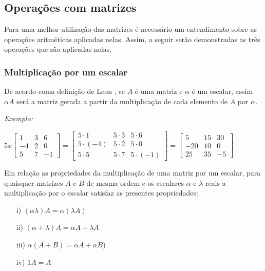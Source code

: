 \subsection{Operações com matrizes}
\noindent Para uma melhor utilização das matrizes é necessário um entendimento sobre as operações aritméticas aplicadas nelas. Assim, a seguir serão demonstradas as três operações que são aplicadas nelas.

\subsubsection{Multiplicação por um escalar}
\noindent De acordo coma definição de Leon \cite{1998:Leon}, se $A$ é uma matriz e $\alpha$ é um escalar, assim $\alpha A$ será a matriz gerada a partir da multiplicação de cada elemento de $A$ por $\alpha$.

\textit{Exemplo:}
\begin{center}
    $5 x
    \begin{bmatrix}
        1 & 3 & 6 \\ 
        -4 & 2 & 0 \\ 
        5 & 7 & -1  
    \end{bmatrix}
    =
    \begin{bmatrix}
        5 \cdot 1 & 5 \cdot 3 & 5 \cdot 6 \\ 
        5 \cdot (-4) & 5 \cdot 2 & 5 \cdot 0 \\ 
        5 \cdot 5 & 5 \cdot 7 & 5 \cdot (-1)  
    \end{bmatrix}
    =
    \begin{bmatrix}
        5 & 15 & 30 \\ 
        -20 & 10 & 0 \\ 
        25 & 35 & -5
    \end{bmatrix}$
\end{center}

Em relação as propriedades da multiplicação de uma matriz por um escalar, para quaisquer matrizes $A$ e $B$ de mesma ordem e os escalares $\alpha$ e $\lambda$ reais a multiplicação por o escalar satisfaz as presentes propriedades:
\begin{enumerate}
    \item[i)] $(\alpha \lambda) A = \alpha(\lambda A)$
    \item[ii)] $(\alpha + \lambda) A = \alpha A + \lambda A$
    \item[iii)] $\alpha(A + B) = \alpha A + \alpha B)$
    \item[iv)] $1 A = A$
\end{enumerate}
 
